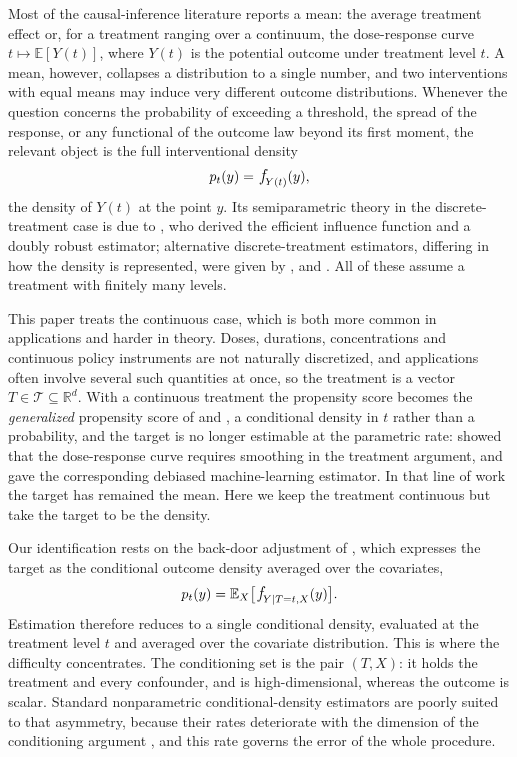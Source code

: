 \documentclass[11pt]{article}
\theoremstyle{plain}
\theoremstyle{definition}
\theoremstyle{remark}
\newcommand{\pE}{\ensuremath{\mathbb{E}}}
\newcommand{\R}{\mathbb{R}}
\newcommand{\cT}{\ensuremath{\mathcal{T}}}
\newcommand{\pf}[1]{\ensuremath{\,\mathlarger{\textit{f}}_{#1}}}
\begin{document}
Most of the causal-inference literature reports a mean: the average treatment effect or, for
a treatment ranging over a continuum, the dose-response curve $t \mapsto \pE[Y(t)]$, where
$Y(t)$ is the potential outcome under treatment level $t$. A mean, however, collapses a
distribution to a single number, and two interventions with equal means may induce very
different outcome distributions. Whenever the question concerns the probability of exceeding
a threshold, the spread of the response, or any functional of the outcome law beyond its
first moment, the relevant object is the full interventional density
\[
p_t(y) = \pf{Y(t)}(y),
\]
the density of $Y(t)$ at the point $y$. Its semiparametric theory in the discrete-treatment
case is due to \citet{kennedy2023density}, who derived the efficient influence function and
a doubly robust estimator; alternative discrete-treatment estimators, differing in how the
density is represented, were given by \citet{melnychuk2023flows},
\citet{ham2024logconcave} and \citet{martinez2023stein}. All of these assume a treatment
with finitely many levels.

This paper treats the continuous case, which is both more common in applications and harder
in theory. Doses, durations, concentrations and continuous policy instruments are not
naturally discretized, and applications often involve several such quantities at once, so
the treatment is a vector $T \in \cT \subseteq \R^d$. With a continuous treatment the
propensity score becomes the \emph{generalized} propensity score of \citet{imbens2000} and
\citet{hirano2004}, a conditional density in $t$ rather than a probability, and the target
is no longer estimable at the parametric rate: \citet{kennedy2017continuous} showed that the
dose-response curve requires smoothing in the treatment argument, and \citet{colangelo2020}
gave the corresponding debiased machine-learning estimator. In that line of work the target
has remained the mean. Here we keep the treatment continuous but take the target to be the
density.

Our identification rests on the back-door adjustment of \citet{pearl1995,pearl2009}, which
expresses the target as the conditional outcome density averaged over the covariates,
\[
p_t(y) = \pE_X\big[\pf{Y \mid T=t,X}(y)\big].
\]
Estimation therefore reduces to a single conditional density, evaluated at the treatment
level $t$ and averaged over the covariate distribution. This is where the difficulty
concentrates. The conditioning set is the pair $(T,X)$: it holds the treatment and every
confounder, and is high-dimensional, whereas the outcome is scalar. Standard nonparametric
conditional-density estimators are poorly suited to that asymmetry, because their rates
deteriorate with the dimension of the conditioning argument
\citep{stone1980,Tsybakov2009NonparametricEstimation}, and this rate governs the error of
the whole procedure.
\end{document}
